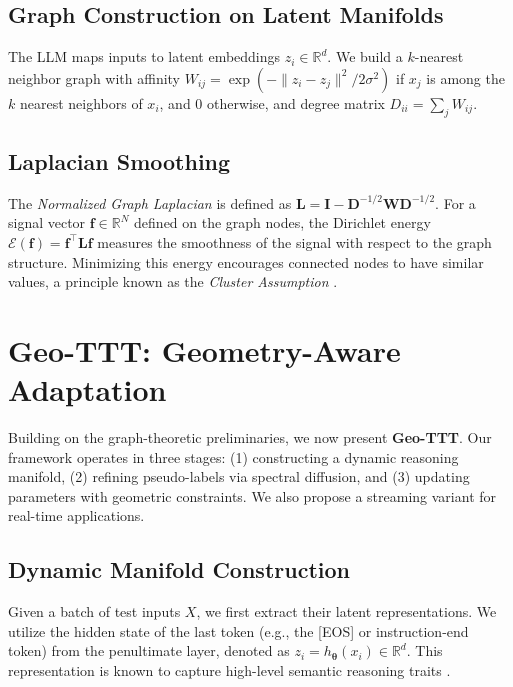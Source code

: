 \documentclass{article}
\theoremstyle{plain}
\theoremstyle{definition}
\theoremstyle{remark}
\newcommand{\R}{\mathbb{R}}
\newcommand{\W}{\mathbf{W}}        %
\newcommand{\Lap}{\mathbf{L}}      %
\newcommand{\ThetaParam}{\boldsymbol{\theta}}
\begin{document}
\subsection{Graph Construction on Latent Manifolds}
The LLM maps inputs to latent embeddings $z_i \in \R^d$. We build a $k$-nearest neighbor graph with affinity
$W_{ij} = \exp(-\|z_i-z_j\|^2/2\sigma^2)$ if $x_j$ is among the $k$ nearest neighbors of $x_i$, and $0$ otherwise, and degree matrix $D_{ii} = \sum_j W_{ij}$.


\subsection{Laplacian Smoothing}
The \textit{Normalized Graph Laplacian} is defined as $\Lap = \mathbf{I} - \mathbf{D}^{-1/2} \W \mathbf{D}^{-1/2}$. For a signal vector $\mathbf{f} \in \R^N$ defined on the graph nodes, the Dirichlet energy $\mathcal{E}(\mathbf{f}) = \mathbf{f}^\top \Lap \mathbf{f}$ measures the smoothness of the signal with respect to the graph structure. Minimizing this energy encourages connected nodes to have similar values, a principle known as the \textit{Cluster Assumption} \cite{chapelle2005manifold}.

\section{Geo-TTT: Geometry-Aware Adaptation}
\label{sec:method}

Building on the graph-theoretic preliminaries, we now present \textbf{Geo-TTT}. Our framework operates in three stages: (1) constructing a dynamic reasoning manifold, (2) refining pseudo-labels via spectral diffusion, and (3) updating parameters with geometric constraints. We also propose a streaming variant for real-time applications.

\subsection{Dynamic Manifold Construction}
Given a batch of test inputs $X$, we first extract their latent representations. We utilize the hidden state of the last token (e.g., the [EOS] or instruction-end token) from the penultimate layer, denoted as $z_i = h_{\ThetaParam}(x_i) \in \R^d$. This representation is known to capture high-level semantic reasoning traits \cite{reiss2023geometric}.
\end{document}
